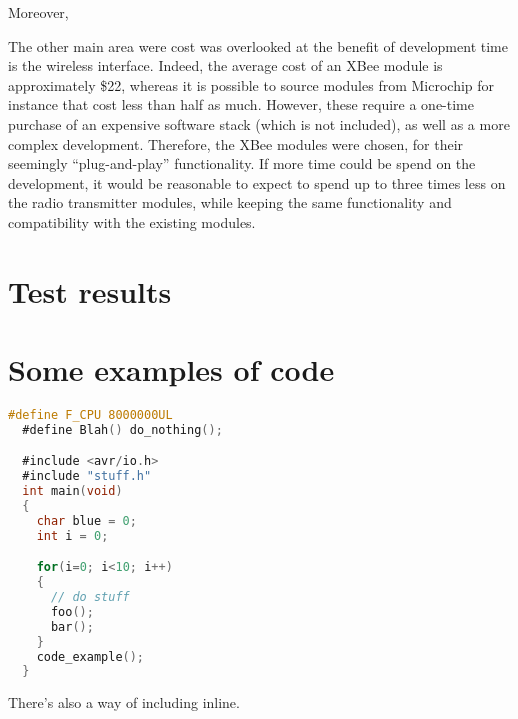 Moreover,

The other main area were cost was overlooked at the benefit of development time
is the wireless interface. Indeed, the average cost of an XBee module is
approximately \$22, whereas it is possible to source modules from Microchip for
instance that cost less than half as much. However, these require a one-time
purchase of an expensive software stack (which is not included), as well as a
more complex development. Therefore, the XBee modules were chosen, for their
seemingly ``plug-and-play'' functionality. If more time could be spend on the
development, it would be reasonable to expect to spend up to three times less on
the radio transmitter modules, while keeping the same functionality and
compatibility with the existing modules.

\section{Test results}

\section{Some examples of code}
\begin{lstlisting}[language=C]
  #define F_CPU 8000000UL
  #define Blah() do_nothing();

  #include <avr/io.h>
  #include "stuff.h"
  int main(void)
  {
    char blue = 0;
    int i = 0;

    for(i=0; i<10; i++)
    {
      // do stuff
      foo();
      bar();
    }
    code_example();
  }
\end{lstlisting}

There's also a way of including  inline.




